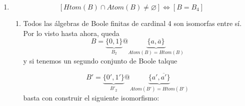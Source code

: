 \documentclass[
]{article}
\providecommand{\tightlist}{%
  \setlength{\itemsep}{0pt}\setlength{\parskip}{0pt}}
\begin{document}
\begin{enumerate}
\begin{enumerate}
\begin{enumerate}
\begin{enumerate}
        \begin{enumerate}
        \def\labelenumv{\arabic{enumv}.}
        \tightlist
        \item
          \[y = \overline{x}\]
        \item
          \[y \in {\{{x,\overline{x}}\}}\]
        \end{enumerate}
      \item
        Como
        \[\mathit{Atom}{{(B_{2})} \cap \mathit{Htom}}{{(B_{2})} = \varnothing}\Rightarrow\forall{y \in B_{\ast}^{\ast}}{y \in {\{{x,\overline{x}}\}}}\]
      \item
        \[\mathit{Atom}{{(B)} \cup \mathit{Htom}}{{{{(B)} \cup {\{ 1,0\}}} = {{\{{x,\overline{x}}\}} \cup {\{ 1,0\}}}} = {\{{1,x,\overline{x},0}\}}}\]
      \item
        \[\forall{y \in B^{\ast}}{{y \cdot \overline{x}} \in {\{{\overline{x},0}\}}}\]
      \item
        \[\mathit{Atom}{{(B)} = {\{{x,\overline{x}}\}}}\]
      \item
        \[\forall{y \in B_{\ast}}{{y + \overline{x}} \in {\{{1,\overline{x}}\}}}\]
      \item
        \[\mathit{Htom}{{(B)} = {\{{x,\overline{x}}\}}}\]
      \item
        \[{{B = {\{{1,x,\overline{x},0}\}}} = {{\{ 1,0\}} \cup \mathit{Atom}}}{{(B)} = {{\{ 1,0\}} \cup \mathit{Htom}}}{(B)}\]
      \item
        \[\mathit{Atom}{{(B)} = \mathit{Htom}}{(B)}\]
      \item
        \[B = B_{4}\]
      \end{enumerate}
    \item
      \[\left\lbrack {\mathit{Htom}{{(B)} \cap \mathit{Atom}}{{(B)} \neq \varnothing}} \right\rbrack\Leftrightarrow\left\lbrack {B = B_{4}} \right\rbrack\]

      \begin{enumerate}
      \def\labelenumiv{\arabic{enumiv}.}
      \item
        Todos las álgebras de Boole finitas de cardinal 4 son isomorfas
        entre sí. Por lo visto hasta ahora, queda
        \[{B = \underset{B_{2}}{\underbrace{\{ 0,1\}}}}@\underset{\mathit{Atom}{{(B)} = \mathit{Htom}}{(B)}}{\underbrace{\{{a,\overline{a}}\}}}\]y
        si tenemos un segundo conjunto de Boole talque

        \[B{' = \underset{B'_{2}}{\underbrace{\{{0',1'}\}}}}@\underset{\mathit{Atom}{{({B'})} = \mathit{Htom}}{({B'})}}{\underbrace{\{{a',\overline{a'}}\}}}\]basta
        con construir el siguiente isomorfismo:


\end{enumerate}
\end{enumerate}
\end{enumerate}
\end{enumerate}
\end{document}
